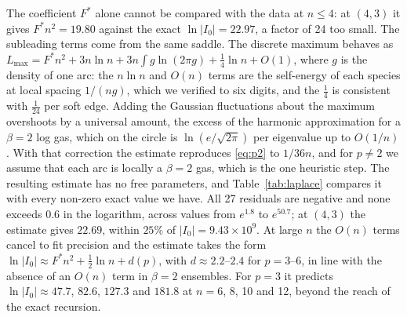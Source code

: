 \documentclass[10pt]{article}
\begin{document}
The coefficient $F^*$ alone cannot be compared with the data at $n\le4$: at $(4,3)$ it gives $F^*n^2=19.80$
against the exact $\ln|I_0|=22.97$, a factor of 24 too small. The subleading terms come from the same saddle. The
discrete maximum behaves as $L_{\max}=F^*n^2+3n\ln n+3n\int g\ln(2\pi g)+\frac14\ln n+O(1)$, where $g$ is the density of
one arc: the $n\ln n$ and $O(n)$ terms are the self-energy of each species at local spacing $1/(ng)$, which we
verified to six digits, and the $\frac14$ is consistent with $\frac1{24}$ per soft edge. Adding the Gaussian
fluctuations about the maximum overshoots by a universal amount, the excess of the harmonic approximation for a
$\beta=2$ log gas, which on the circle is $\ln(e/\sqrt{2\pi})$ per eigenvalue up to $O(1/n)$. With that correction the
estimate reproduces \eqref{eq:p2} to $1/36n$, and for $p\ne2$ we assume that each arc is locally a $\beta=2$ gas, which
is the one heuristic step. The resulting estimate has no free parameters, and Table~\ref{tab:laplace} compares it with
every non-zero exact value we have. All 27 residuals are negative and none exceeds $0.6$ in the logarithm, across
values from $e^{1.8}$ to $e^{50.7}$; at $(4,3)$ the estimate gives $22.69$, within $25\%$ of
$|I_0|=9.43\times10^9$. At large $n$ the $O(n)$ terms cancel to fit precision and the estimate takes the form
$\ln|I_0|\approx F^*n^2+\frac12\ln n+d(p)$, with $d\approx2.2$--$2.4$ for $p=3$--$6$, in line with the absence of an
$O(n)$ term in $\beta=2$ ensembles. For $p=3$ it predicts $\ln|I_0|\approx47.7$, $82.6$, $127.3$ and $181.8$ at
$n=6$, 8, 10 and 12, beyond the reach of the exact recursion.
\end{document}
